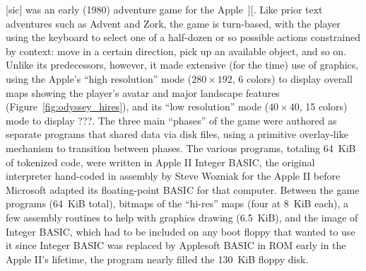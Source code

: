  [sic] was an early (1980) adventure game
for the Apple~][.
Like prior text adventures such as Advent and Zork, the game is
turn-based, with the player using the 
keyboard to select one of a half-dozen or so possible actions
constrained by context: move in a certain direction, pick up an
available object, and so on.
Unlike its predecessors, however, it made extensive (for the time) use of
graphics, using the Apple's ``high resolution'' mode ($280\times 192$, 6 colors)
to display overall maps showing the player's
avatar and major landscape features (Figure~\ref{fig:odyssey_hires}), and its
``low resolution'' mode ($40\times 40$, 15
colors) mode to display ???.
The three main ``phases'' of the game were authored as separate programs
that shared data via disk files, using a primitive overlay-like mechanism
to transition between phases.  
The various programs, totaling 64~KiB of tokenized code, were written in Apple II Integer
BASIC, the 
original interpreter hand-coded in assembly by Steve Wozniak for
the Apple II before Microsoft adapted its floating-point BASIC for that
computer.  Between the game programs (64~KiB total), bitmaps of the ``hi-res''
maps (four at 8~KiB each), a few assembly routines to help with graphics
drawing (6.5~KiB), and the image of Integer BASIC, which had to be
included on any boot floppy that wanted to use it since Integer BASIC
was replaced by Applesoft BASIC in ROM early in the Apple II's lifetime,
the program nearly filled the 130~KiB floppy disk.
